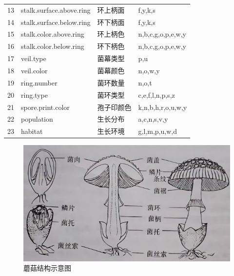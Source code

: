 \documentclass[lang=cn,11pt,a4paper,cite=super]{elegantpaper}
\begin{document}
\begin{enumerate}
\begin{table}[hbt]
{\begin{tabular}{llll}
      13 & stalk.surface.above.ring & 环上柄面   & f,y,k,s                  \\
      14 & stalk.surface.below.ring & 环下柄面   & f,y,k,s                  \\
      15 & stalk.color.above.ring   & 环上柄色   & n,b,c,g,o,p,e,w,y        \\
      16 & stalk.color.below.ring   & 环下柄色   & n,b,c,g,o,p,e,w,y        \\
      17 & veil.type                & 菌幕类型   & p,u                      \\
      18 & veil.color               & 菌幕颜色   & n,o,w,y                  \\
      19 & ring.number              & 菌环数量   & n,o,t                    \\
      20 & ring.type                & 菌环类型   & c,e,f,l,n,p,s,z          \\
      21 & spore.print.color        & 孢子印颜色  & k,n,b,h,r,o,u,w,y        \\
      22 & population               & 生长分布   & a,c,n,s,v,y              \\
      23 & habitat                  & 生长环境    & g,l,m,p,u,w,d            \\
      \bottomrule
      \end{tabular}}
   \end{table}
   \begin{figure}[!hbt]
      \centering
      \includegraphics[width=0.6\linewidth]{img/syt.jpg}
      \caption{蘑菇结构示意图}
      \label{fig:syt}
   \end{figure}
   

\end{enumerate}
\end{document}
